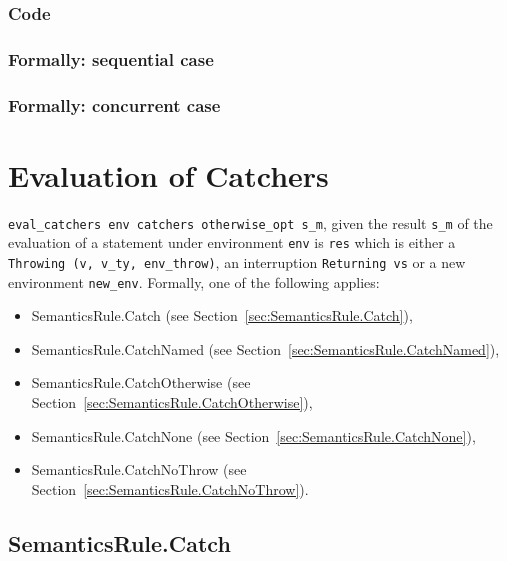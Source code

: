 \documentclass{book}
\begin{document}
    \subsection{Code}

\begin{emptyformal}
    \subsection{Formally: sequential case}

  \subsection{Formally: concurrent case}
\end{emptyformal}


\chapter{Evaluation of Catchers \label{chap:eval_catchers}}
\texttt{eval\_catchers env catchers otherwise\_opt s\_m}, given the result
\texttt{s\_m} of the evaluation of a statement under environment \texttt{env}
is \texttt{res} which is either a \texttt{Throwing (v, v\_ty, env\_throw)}, an
interruption \texttt{Returning vs} or a new environment \texttt{new\_env}.
Formally, one of the following applies:
\begin{itemize}
\item SemanticsRule.Catch (see Section~\ref{sec:SemanticsRule.Catch}),
\item SemanticsRule.CatchNamed (see Section~\ref{sec:SemanticsRule.CatchNamed}),
\item SemanticsRule.CatchOtherwise (see Section~\ref{sec:SemanticsRule.CatchOtherwise}),
\item SemanticsRule.CatchNone (see Section~\ref{sec:SemanticsRule.CatchNone}),
\item SemanticsRule.CatchNoThrow (see Section~\ref{sec:SemanticsRule.CatchNoThrow}).
\end{itemize}

\section{SemanticsRule.Catch \label{sec:SemanticsRule.Catch}}
\end{document}
